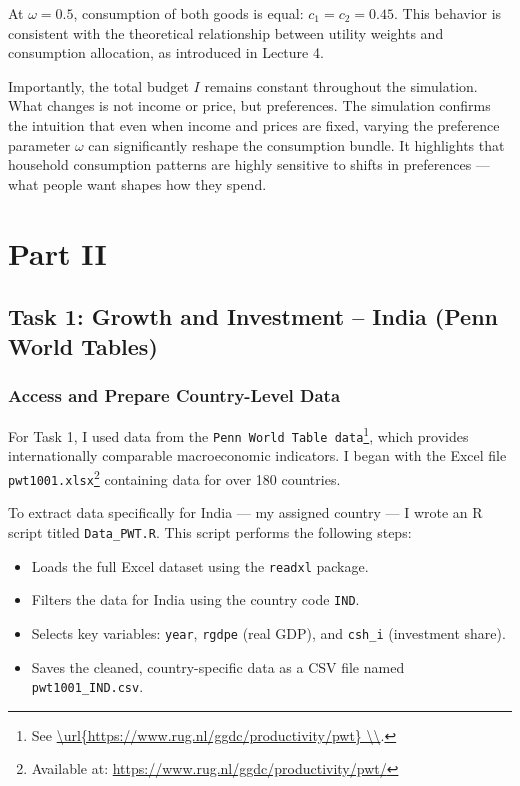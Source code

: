 \documentclass[12pt,a4paper,notitlepage]{article}
\numberwithin{equation}{section}
\begin{document}
\begin{itemize}
At \( \omega = 0.5 \), consumption of both goods is equal: \( c_1 = c_2 = 0.45 \). This behavior is consistent with the theoretical relationship between utility weights and consumption allocation, as introduced in Lecture 4.

Importantly, the total budget \( I \) remains constant throughout the simulation. What changes is not income or price, but preferences. The simulation confirms the intuition that even when income and prices are fixed, varying the preference parameter \( \omega \) can significantly reshape the consumption bundle. It highlights that household consumption patterns are highly sensitive to shifts in preferences — what people want shapes how they spend.

\newpage
\section {Part II }

\subsection{Task 1: Growth and Investment – India (Penn World Tables)}
\subsubsection{   Access and Prepare Country-Level Data}

For Task 1, I used data from the \texttt{Penn World Table data}\footnote{See \url {\url{https://www.rug.nl/ggdc/productivity/pwt} \\}.}, which provides internationally comparable macroeconomic indicators. I began with the Excel file \texttt{pwt1001.xlsx}\footnote{Available at: \url{https://www.rug.nl/ggdc/productivity/pwt/}} containing data for over 180 countries.

To extract data specifically for India — my assigned country — I wrote an R script titled \texttt{Data\_PWT.R}. This script performs the following steps:

\begin{itemize}
  \item Loads the full Excel dataset using the \texttt{readxl} package.
  \item Filters the data for India using the country code \texttt{IND}.
  \item Selects key variables: \texttt{year}, \texttt{rgdpe} (real GDP), and \texttt{csh\_i} (investment share).
  \item Saves the cleaned, country-specific data as a CSV file named \texttt{pwt1001\_IND.csv}.
\end{itemize}


\end{itemize}
\end{document}
